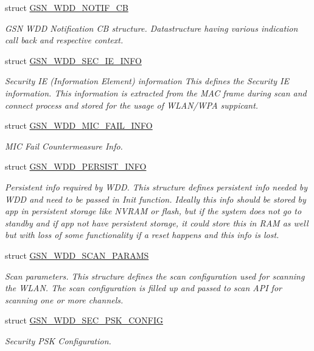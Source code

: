 \begin{DoxyCompactItemize}
struct \hyperlink{a00281}{GSN\_\-WDD\_\-NOTIF\_\-CB}
\begin{DoxyCompactList}\small\item\em GSN WDD Notification CB structure. Datastructure having various indication call back and respective context. \end{DoxyCompactList}\item 
struct \hyperlink{a00292}{GSN\_\-WDD\_\-SEC\_\-IE\_\-INFO}
\begin{DoxyCompactList}\small\item\em Security IE (Information Element) information This defines the Security IE information. This information is extracted from the MAC frame during scan and connect process and stored for the usage of WLAN/WPA suppicant. \end{DoxyCompactList}\item 
struct \hyperlink{a00278}{GSN\_\-WDD\_\-MIC\_\-FAIL\_\-INFO}
\begin{DoxyCompactList}\small\item\em MIC Fail Countermeasure Info. \end{DoxyCompactList}\item 
struct \hyperlink{a00282}{GSN\_\-WDD\_\-PERSIST\_\-INFO}
\begin{DoxyCompactList}\small\item\em Persistent info required by WDD. This structure defines persistent info needed by WDD and need to be passed in Init function. Ideally this info should be stored by app in persistent storage like NVRAM or flash, but if the system does not go to standby and if app not have persistent storage, it could store this in RAM as well but with loss of some functionality if a reset happens and this info is lost. \end{DoxyCompactList}\item 
struct \hyperlink{a00286}{GSN\_\-WDD\_\-SCAN\_\-PARAMS}
\begin{DoxyCompactList}\small\item\em Scan parameters. This structure defines the scan configuration used for scanning the WLAN. The scan configuration is filled up and passed to scan API for scanning one or more channels. \end{DoxyCompactList}\item 
struct \hyperlink{a00294}{GSN\_\-WDD\_\-SEC\_\-PSK\_\-CONFIG}
\begin{DoxyCompactList}\small\item\em Security PSK Configuration. \end{DoxyCompactList}\end{DoxyCompactItemize}
